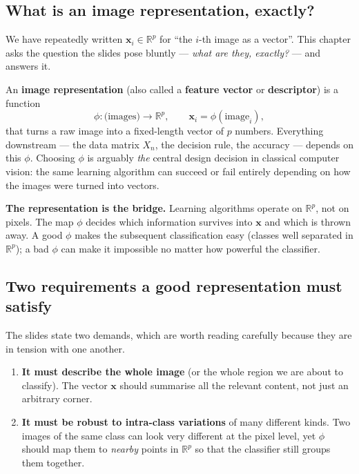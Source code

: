 \documentclass{report}
\newcommand{\R}{\mathbb{R}}
\newcommand{\xvec}{\mathbf{x}}
\newcommand{\Xmat}{X_n}
\begin{document}
\subsection{What is an image representation, exactly?}

We have repeatedly written $\xvec_i \in \R^p$ for ``the $i$-th image as a
vector''. This chapter asks the question the slides pose bluntly --- \emph{what
are they, exactly?} --- and answers it.

An \textbf{image representation} (also called a \textbf{feature vector} or
\textbf{descriptor}) is a function
\[
\phi : \text{(images)} \longrightarrow \R^p,
\qquad
\xvec_i = \phi(\text{image}_i),
\]
that turns a raw image into a fixed-length vector of $p$ numbers. Everything
downstream --- the data matrix $\Xmat$, the decision rule, the accuracy ---
depends on this $\phi$. Choosing $\phi$ is arguably \emph{the} central design
decision in classical computer vision: the same learning algorithm can succeed
or fail entirely depending on how the images were turned into vectors.

\begin{keybox}
\textbf{The representation is the bridge.} Learning algorithms operate on
$\R^p$, not on pixels. The map $\phi$ decides which information survives into
$\xvec$ and which is thrown away. A good $\phi$ makes the subsequent
classification easy (classes well separated in $\R^p$); a bad $\phi$ can make
it impossible no matter how powerful the classifier.
\end{keybox}

\subsection{Two requirements a good representation must satisfy}

The slides state two demands, which are worth reading carefully because they
are in tension with one another.

\begin{enumerate}
\item \textbf{It must describe the whole image} (or the whole region we are
about to classify). The vector $\xvec$ should summarise all the relevant
content, not just an arbitrary corner.

\item \textbf{It must be robust to intra-class variations} of many different
kinds. Two images of the same class can look very different at the pixel level,
yet $\phi$ should map them to \emph{nearby} points in $\R^p$ so that the
classifier still groups them together.
\end{enumerate}
\end{document}
